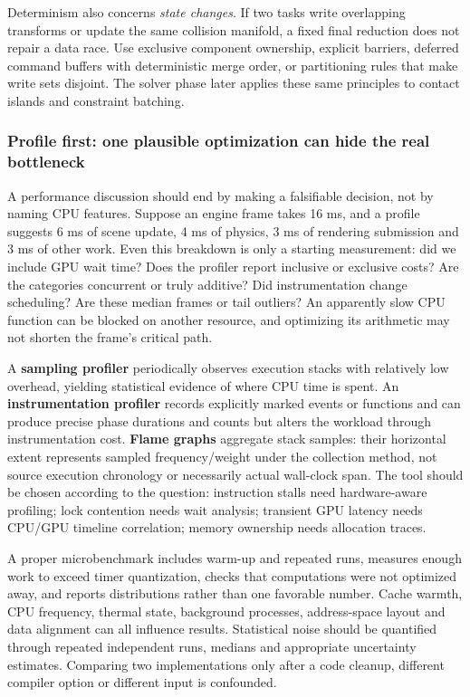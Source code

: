 Determinism also concerns \emph{state changes}. If two tasks write overlapping transforms or update the same collision manifold, a fixed final reduction does not repair a data race. Use exclusive component ownership, explicit barriers, deferred command buffers with deterministic merge order, or partitioning rules that make write sets disjoint. The solver phase later applies these same principles to contact islands and constraint batching.

\subsubsection{Profile first: one plausible optimization can hide the real bottleneck}\label{profile-first-one-plausible-optimization-can-hide-the-real-bottleneck}

A performance discussion should end by making a falsifiable decision, not by naming CPU features. Suppose an engine frame takes 16 ms, and a profile suggests 6 ms of scene update, 4 ms of physics, 3 ms of rendering submission and 3 ms of other work. Even this breakdown is only a starting measurement: did we include GPU wait time? Does the profiler report inclusive or exclusive costs? Are the categories concurrent or truly additive? Did instrumentation change scheduling? Are these median frames or tail outliers? An apparently slow CPU function can be blocked on another resource, and optimizing its arithmetic may not shorten the frame's critical path.

A \textbf{sampling profiler} periodically observes execution stacks with relatively low overhead, yielding statistical evidence of where CPU time is spent. An \textbf{instrumentation profiler} records explicitly marked events or functions and can produce precise phase durations and counts but alters the workload through instrumentation cost. \textbf{Flame graphs} aggregate stack samples: their horizontal extent represents sampled frequency/weight under the collection method, not source execution chronology or necessarily actual wall-clock span. The tool should be chosen according to the question: instruction stalls need hardware-aware profiling; lock contention needs wait analysis; transient GPU latency needs CPU/GPU timeline correlation; memory ownership needs allocation traces.

A proper microbenchmark includes warm-up and repeated runs, measures enough work to exceed timer quantization, checks that computations were not optimized away, and reports distributions rather than one favorable number. Cache warmth, CPU frequency, thermal state, background processes, address-space layout and data alignment can all influence results. Statistical noise should be quantified through repeated independent runs, medians and appropriate uncertainty estimates. Comparing two implementations only after a code cleanup, different compiler option or different input is confounded.

